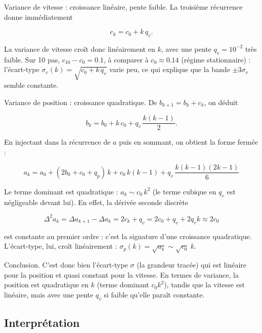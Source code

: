 \documentclass[11pt]{article}
\theoremstyle{remark}
\theoremstyle{definition}
\begin{document}
Variance de vitesse : croissance linéaire, pente faible. La troisième récurrence
donne immédiatement

\begin{equation}
c_k = c_0 + k\,q_v .
\end{equation}

La variance de vitesse croît donc linéairement en $k$, avec une pente $q_v = 10^{-2}$
très faible. Sur 10 pas, $c_{10} - c_0 = 0.1$, à comparer à $c_0 \approx 0.14$ (régime
stationnaire) : l'écart-type $\sigma_v(k) = \sqrt{c_0 + k\,q_v}$ varie peu, ce qui explique que
la bande $\pm 3\sigma_v$ semble constante.

Variance de position : croissance quadratique. De $b_{k+1} = b_k + c_k$, on déduit

\begin{equation}
b_k = b_0 + k\,c_0 + q_v\,\frac{k(k-1)}{2} .
\end{equation}

En injectant dans la récurrence de $a$ puis en sommant, on obtient la forme fermée :

\begin{equation}
\boxed{\,a_k = a_0 + (2b_0 + c_0 + q_p)\,k + c_0\,k(k-1) + q_v\,\frac{k(k-1)(2k-1)}{6}\,}
\end{equation}

Le terme dominant est quadratique : $a_k \sim c_0\,k^2$ (le terme cubique en $q_v$ est
négligeable devant lui). En effet, la dérivée seconde discrète

\begin{equation}
\Delta^2 a_k = \Delta a_{k+1} - \Delta a_k = 2c_k + q_v = 2c_0 + q_v + 2 q_v k \approx 2c_0
\end{equation}

est constante au premier ordre : c'est la signature d'une croissance quadratique. L'écart-type,
lui, croît linéairement : $\sigma_p(k) = \sqrt{a_k} \sim \sqrt{c_0}\ k$.

Conclusion. C'est donc bien l'écart-type $\sigma$ (la grandeur tracée) qui est
linéaire pour la position et quasi constant pour la vitesse. En termes de variance, la
position est quadratique en $k$ (terme dominant $c_0 k^2$), tandis que la vitesse est
linéaire, mais avec une pente $q_v$ si faible qu'elle paraît constante.

\subsection{Interprétation}
\end{document}
